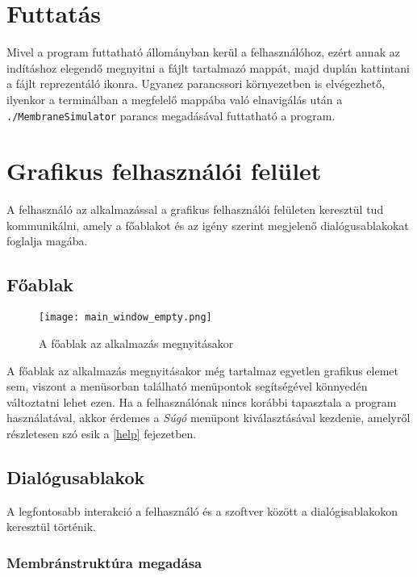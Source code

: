 \section{Futtatás}

Mivel a program futtatható állományban kerül a felhasználóhoz, ezért annak az indításhoz elegendő megnyitni a fájlt tartalmazó mappát, majd duplán kattintani a fájlt reprezentáló ikonra. Ugyanez parancssori környezetben is elvégezhető, ilyenkor a terminálban a megfelelő mappába való elnavigálás után a 
\verb|./MembraneSimulator| parancs megadásával futtatható a program.

\section{Grafikus felhasználói felület}

A felhasználó az alkalmazással a grafikus felhasználói felületen keresztül tud kommunikálni, amely a főablakot és az igény szerint megjelenő dialógusablakokat foglalja magába.

\subsection{Főablak}

\begin{figure}[H]
	\centering
	\texttt{[image: main\_window\_empty.png]}
	\caption{A főablak az alkalmazás megnyitásakor}
	\label{fig:example-1}
\end{figure}

A főablak az alkalmazás megnyitásakor még tartalmaz egyetlen grafikus elemet sem, viszont a menüsorban található menüpontok segítségével könnyedén változtatni lehet ezen. Ha a felhasználónak nincs korábbi tapasztala a program használatával, akkor érdemes a \textit{Súgó} menüpont kiválasztásával kezdenie, amelyről részletesen szó esik a \ref{help} fejezetben.

\subsection{Dialógusablakok}

A legfontosabb interakció a felhasználó és a szoftver között a dialógisablakokon keresztül történik.  

\subsubsection{Membránstruktúra megadása}

